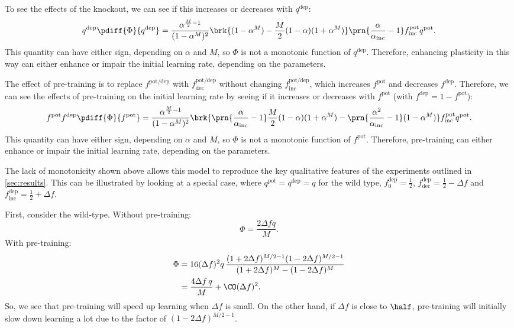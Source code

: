 \documentclass[10pt]{article}
\newcommand{\pot}{^{\text{pot}}}
\newcommand{\dep}{^{\text{dep}}}
\newcommand{\potdep}{^{\text{pot/dep}}}
\newcommand{\inc}{_{\text{inc}}}
\newcommand{\dec}{_{\text{dec}}}
\begin{document}
To see the effects of the knockout, we can see if this increases or decreases with $q\dep$:
%
\begin{equation}\label{eq:serialderq}
  q\dep \pdiff{\Phi}{q\dep} =
    \frac{\alpha^{\frac{M}{2} - 1}}{(1 - \alpha^M)^2}
    \brk{(1 - \alpha^M) - \frac{M}{2} (1 - \alpha) (1 + \alpha^M) }
    \prn{\frac{\alpha}{\alpha\inc} - 1} f\inc\pot  q\pot.
\end{equation}
%
This quantity can have either sign, depending on $\alpha$ and $M$, so $\Phi$ is not a monotonic function of $q\dep$.
Therefore, enhancing plasticity in this way can either enhance or impair the initial learning rate, depending on the parameters.

The effect of pre-training is to replace $f\potdep$ with $f\potdep\dec$ without changing $f\potdep\inc$, which increases $f\pot$ and decreases $f\dep$.
Therefore, we can see the effects of pre-training on the initial learning rate by seeing if it increases or decreases with $f\pot$ (with $f\dep = 1 - f\pot$):
%
\begin{equation}\label{eq:serialderf}
  f\pot f\dep \pdiff{\Phi}{f\pot} =
    \frac{\alpha^{\frac{M}{2} - 1}}{(1 - \alpha^M)^2}
      \brk{ \prn{\frac{\alpha}{\alpha\inc} - 1} \frac{M}{2} (1 - \alpha) (1 + \alpha^M)
      - \prn{\frac{\alpha^2}{\alpha\inc} - 1} (1 - \alpha^M) }
      f\inc\pot  q\pot.
\end{equation}
%
This quantity can have either sign, depending on $\alpha$ and $M$, so $\Phi$ is not a monotonic function of $f\pot$.
Therefore, pre-training can either enhance or impair the initial learning rate, depending on the parameters.

The lack of monotonicity shown above allows this model to reproduce the key qualitative features of the experiments outlined in \autoref{sec:results}.
This can be illustrated by looking at a special case, where $q\pot = q\dep = q$ for the wild type, $f\dep_0 = \frac{1}{2}$, $f\dep\dec = \frac{1}{2} - \Delta f$ and $f\dep\inc = \frac{1}{2} + \Delta f$.


First, consider the wild-type.
Without pre-training:
%
\begin{equation}\label{eq:multiWTnopre}
  \Phi = \frac{2{\Delta f}q}{M}.
\end{equation}
%
With pre-training:
%
\begin{equation}\label{eq:multiWTpre}
\begin{aligned}
  \Phi &= 16(\Delta f)^2q \, \frac{(1+2\Delta f)^{M/2-1} (1-2\Delta f)^{M/2-1}}
          {(1+2\Delta f)^M - (1-2\Delta f)^M} \\
       &= \frac{4{\Delta f}\,q}{M} + \CO(\Delta f)^2.
\end{aligned}
\end{equation}
%
So, we see that pre-training will speed up learning when $\Delta f$ is small.
On the other hand, if $\Delta f$ is close to $\half$, pre-training will initially slow down learning a lot due to the factor of $(1-2\Delta f)^{M/2-1}$.
\end{document}
